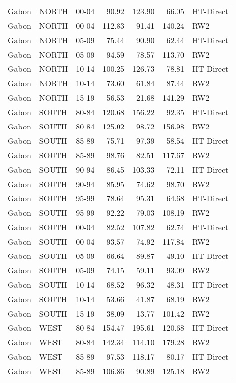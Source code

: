 \begin{longtable}{lllrrrl}
  Gabon & NORTH & 00-04 & 90.92 & 123.90 & 66.05 & HT-Direct \\ 
  Gabon & NORTH & 00-04 & 112.83 & 91.41 & 140.24 & RW2 \\ 
  Gabon & NORTH & 05-09 & 75.44 & 90.90 & 62.44 & HT-Direct \\ 
  Gabon & NORTH & 05-09 & 94.59 & 78.57 & 113.70 & RW2 \\ 
  Gabon & NORTH & 10-14 & 100.25 & 126.73 & 78.81 & HT-Direct \\ 
  Gabon & NORTH & 10-14 & 73.60 & 61.84 & 87.44 & RW2 \\ 
  Gabon & NORTH & 15-19 & 56.53 & 21.68 & 141.29 & RW2 \\ 
  Gabon & SOUTH & 80-84 & 120.68 & 156.22 & 92.35 & HT-Direct \\ 
  Gabon & SOUTH & 80-84 & 125.02 & 98.72 & 156.98 & RW2 \\ 
  Gabon & SOUTH & 85-89 & 75.71 & 97.39 & 58.54 & HT-Direct \\ 
  Gabon & SOUTH & 85-89 & 98.76 & 82.51 & 117.67 & RW2 \\ 
  Gabon & SOUTH & 90-94 & 86.45 & 103.33 & 72.11 & HT-Direct \\ 
  Gabon & SOUTH & 90-94 & 85.95 & 74.62 & 98.70 & RW2 \\ 
  Gabon & SOUTH & 95-99 & 78.64 & 95.31 & 64.68 & HT-Direct \\ 
  Gabon & SOUTH & 95-99 & 92.22 & 79.03 & 108.19 & RW2 \\ 
  Gabon & SOUTH & 00-04 & 82.52 & 107.82 & 62.74 & HT-Direct \\ 
  Gabon & SOUTH & 00-04 & 93.57 & 74.92 & 117.84 & RW2 \\ 
  Gabon & SOUTH & 05-09 & 66.64 & 89.87 & 49.10 & HT-Direct \\ 
  Gabon & SOUTH & 05-09 & 74.15 & 59.11 & 93.09 & RW2 \\ 
  Gabon & SOUTH & 10-14 & 68.52 & 96.32 & 48.31 & HT-Direct \\ 
  Gabon & SOUTH & 10-14 & 53.66 & 41.87 & 68.19 & RW2 \\ 
  Gabon & SOUTH & 15-19 & 38.09 & 13.77 & 101.42 & RW2 \\ 
  Gabon & WEST & 80-84 & 154.47 & 195.61 & 120.68 & HT-Direct \\ 
  Gabon & WEST & 80-84 & 142.34 & 114.10 & 179.28 & RW2 \\ 
  Gabon & WEST & 85-89 & 97.53 & 118.17 & 80.17 & HT-Direct \\ 
  Gabon & WEST & 85-89 & 106.86 & 90.89 & 125.18 & RW2 \\ 

\end{longtable}
